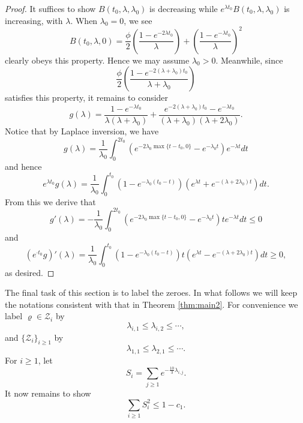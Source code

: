 \documentclass[10pt, reqno]{amsart}
\numberwithin{equation}{section}
\newcommand{\bb}[1]{\left(#1\right)}
\renewcommand{\rho }{\operatorname{\varrho}}
\begin{document}
\begin{proof}
It suffices to show $B(t_0,\lambda,\lambda_0)$ is decreasing while $e^{\lambda t_0}B(t_0,\lambda,\lambda_0)$ is increasing, with $\lambda$. When $\lambda_0=0$, we see
\begin{equation}\label{eq:B0}
B(t_0,\lambda,0)=\frac{\phi}{2}\bb{\frac{1-e^{-2\lambda t_0}}{\lambda}}+\bb{\frac{1-e^{-\lambda t_0}}{\lambda}}^2
\end{equation}
clearly obeys this property. Hence we may assume $\lambda_0>0$. Meanwhile, since
\begin{equation}\label{eq:FirstTerm}
\frac{\phi}{2}\bb{\frac{1-e^{-2(\lambda+\lambda_0)t_0}}{\lambda+\lambda_0}}
\end{equation}
satisfies this property, it remains to consider
\begin{equation}\label{eq:g}
g(\lambda)=\frac{1-e^{-\lambda t_0}}{\lambda (\lambda+\lambda_0)}+\frac{e^{-2(\lambda+\lambda_0) t_0}-e^{-\lambda t_0}}{(\lambda+\lambda_0)(\lambda+2\lambda_0)}.
\end{equation}
Notice that by Laplace inversion, we have
\begin{equation}\label{eq:LaplaceInversion}
g(\lambda)=\frac{1}{\lambda_0}\int_{0}^{2t_0}\bb{e^{-2\lambda_0 \max\{t-t_0,0\}}-e^{-\lambda_0t}}e^{-\lambda t}dt
\end{equation}
and hence
\begin{equation}\label{eq:gExp}
e^{\lambda t_0}g(\lambda)=\frac{1}{\lambda_0}\int_0^{t_0}(1-e^{-\lambda_0(t_0-t)})(e^{\lambda t}+e^{-(\lambda+2\lambda_0)t})dt.
\end{equation}
From this we derive that
\begin{equation}\label{eq:gDerivative}
g'(\lambda)=-\frac{1}{\lambda_0}\int_{0}^{2t_0}\bb{e^{-2\lambda_0 \max\{t-t_0,0\}}-e^{-\lambda_0t}}te^{-\lambda t}dt\leq 0
\end{equation}
and
\begin{equation}\label{eq:gExpDerivative}
(e^{\cdot t_0}g)'(\lambda)=\frac{1}{\lambda_0}\int_0^{t_0}(1-e^{-\lambda_0(t_0-t)})t(e^{\lambda t}-e^{-(\lambda+2\lambda_0)t})dt\geq 0,
\end{equation}
as desired.
\end{proof}

The final task of this section is to label the zeroes. In what follows we will keep the notations consistent with that in Theorem \ref{thm:main2}. For convenience we label $\rho \in \mathcal{Z}_i$ by
\begin{equation}\label{eq:Labeling}
\lambda_{i,1}\leq \lambda_{i,2}\leq \cdots,
\end{equation}
and $\{\mathcal{Z}_i\}_{i\geq 1}$ by
\begin{equation}\label{eq:LabelingSets}
\lambda_{1,1}\leq \lambda_{2,1}\leq \cdots.
\end{equation}
For $i\geq 1$, let
\begin{equation}\label{eq:Si}
S_i=\sum_{j\geq 1}e^{-\frac{10}{3}\lambda_{i,j}}.
\end{equation}
It now remains to show
\begin{equation}\label{eq:FinalEq}
\sum_{i\geq 1}S_i^2\leq 1-c_1.
\end{equation}
\end{document}
